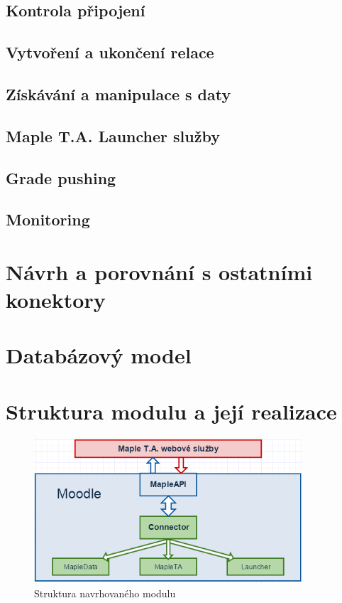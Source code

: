 \documentclass[
print,
  11pt,
  table,   
  nolof,    
  nolot,
  oneside,
  final
]{fithesis3}
\begin{document}
		\subsection{Kontrola připojení}
		\subsection{Vytvoření a ukončení relace}
		\subsection{Získávání a manipulace s daty}
		\subsection{Maple T.A. Launcher služby}
		\subsection{Grade pushing}
		\subsection{Monitoring}
	\section{Návrh a porovnání s ostatními konektory}
	\section{Databázový model}
	\section{Struktura modulu a její realizace}

		\begin{figure}
		  \begin{center}
		    \includegraphics[width=100mm]{images/struktura_modulu.png}
		   \end{center}
		  \caption{Struktura navrhovaného modulu}
		  \label{fig:strukturamodulu}
		\end{figure}
\end{document}
